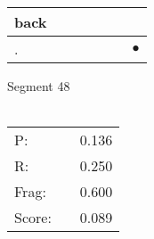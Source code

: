 \documentclass[landscape]{article}
\newcommand{\ssp}{\hspace{2pt}}
\newcommand{\mex}{\cellcolor{g}$\bullet$}
\begin{document}
\begin{tabular}{|l|p{10pt}|p{10pt}|p{10pt}|p{10pt}|p{10pt}|p{10pt}|}
\hline
\ssp back \ssp&\hspace{2pt}&\hspace{2pt}&\hspace{2pt}&\hspace{2pt}&\hspace{2pt}&\hspace{2pt}\\
\hline
\ssp \cellcolor{ref5}. \ssp&\hspace{2pt}&\hspace{2pt}&\hspace{2pt}&\hspace{2pt}&\hspace{2pt}&\hspace{2pt}\mex\\
\hline
\end{tabular}

\vspace{6pt}
\noindent Segment 48\\\\
\noindent\begin{tabular}{lm{12pt}r}
\hline
P:&&0.136\\
R:&&0.250\\
Frag:&&0.600\\
Score:&&0.089\\
\end{tabular}

\newpage
\end{document}
